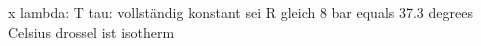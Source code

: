 x lambda:  
T tau: vollständig konstant sei R gleich 8 bar  
equals 37.3 degrees Celsius  
drossel ist isotherm